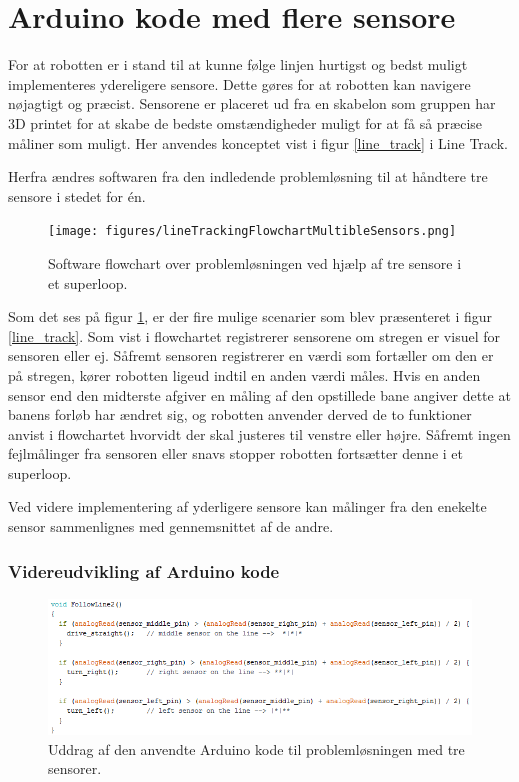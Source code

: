 \section{Arduino kode med flere sensore}
For at robotten er i stand til at kunne følge linjen hurtigst og bedst muligt implementeres ydereligere sensore. Dette gøres for at robotten kan navigere nøjagtigt og præcist. Sensorene er placeret ud fra en skabelon som gruppen har 3D printet for at skabe de bedste omstændigheder muligt for at få så præcise måliner som muligt.
\newline 
Her anvendes konceptet vist i figur \ref{line_track} i Line Track. 
\newline


Herfra ændres softwaren fra den indledende problemløsning til at håndtere tre sensore i stedet for én. 

\begin{figure}[h!]
  \centering
  \texttt{[image: figures/lineTrackingFlowchartMultibleSensors.png]}
  \caption{Software flowchart over problemløsningen ved hjælp af tre sensore i et superloop.}
  \label{flowchart_flere_sensorer}
\end{figure}
\newpage

Som det ses på figur \ref{flowchart_flere_sensorer}, er der fire mulige scenarier som blev præsenteret i figur \ref{line_track}.
Som vist i flowchartet registrerer sensorene om stregen er visuel for sensoren eller ej. Såfremt sensoren registrerer en værdi som fortæller om den er på stregen, kører robotten ligeud indtil en anden værdi måles. 
\newline 
Hvis en anden sensor end den midterste afgiver en måling af den opstillede bane angiver dette at banens forløb har ændret sig, og robotten anvender derved de to funktioner anvist i flowchartet hvorvidt der skal justeres til venstre eller højre. 
\newline
Såfremt ingen fejlmålinger fra sensoren eller snavs stopper robotten fortsætter denne i et superloop.
\newpage

Ved videre implementering af yderligere sensore kan målinger fra den enekelte sensor sammenlignes med gennemsnittet af de andre.

\subsubsection{Videreudvikling af Arduino kode}
\begin{figure}[h!]
  \centering
  \includegraphics[width=1.0\textwidth]{figures/followLine3.png}
  \caption{Uddrag af den anvendte Arduino kode til problemløsningen med tre sensorer.}
  \label{tre_sensore_followline}
\end{figure}
\newpage








